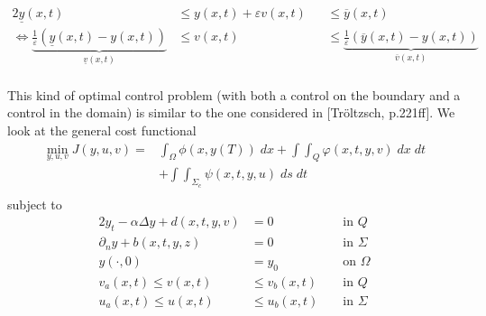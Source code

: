 \documentclass[
12pt, %
a4paper, %
onecolumn, %
portrait %
]{article}
\begin{document}
\begin{alignat*}{2}
\underline{y}(x,t) &\leq y(x,t) + \varepsilon v(x,t) &&\leq \overline{y}(x,t) \\
\Leftrightarrow \underbrace{\frac{1}{\varepsilon}(\underline{y}(x,t) - y(x,t))}_{\underline{v}(x,t)} &\leq v(x,t) &&\leq \underbrace{\frac{1}{\varepsilon}(\overline{y}(x,t) - y(x,t))}_{\overline{v}(x,t)} \\
\end{alignat*}

This kind of optimal control problem (with both a control on the boundary and a control in the domain) is similar to the one considered in [Tr\"oltzsch, p.221ff]. We look at the general cost functional
\begin{align*}
\min_{y,u,v} J(y, u, v) = & \int_{\Omega} \phi(x, y(T)) \; dx + \int \int_{Q} \varphi(x, t, y, v) \; dx \; dt \\
& + \int \int_{\Sigma_c} \psi(x,t,y, u) \; ds \; dt \\
\end{align*}
subject to
\begin{alignat*}{2}
y_t - \alpha \Delta y + d(x,t,y,v) &= 0 && \text{ in } Q \\
\partial_n y + b(x,t,y,z) &= 0 && \text{ in } \Sigma \\
y(\cdot,0) &= y_0 && \text{ on } \Omega \\
v_a(x,t) \leq v(x,t) &\leq v_b(x,t) &&\text{ in } Q \\
u_a(x,t) \leq u(x,t) &\leq u_b(x,t) &&\text{ in } \Sigma
\end{alignat*}
\end{document}
